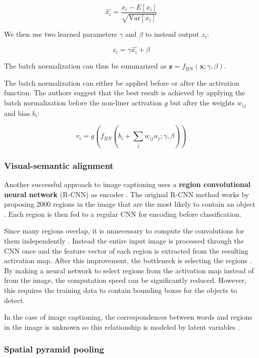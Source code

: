 \[
\hat{x_i} = \frac{x_i - E[x_i]}{ \sqrt{\text{Var} [x_i]} }
\]

We then use two learned parameters $\gamma$ and $\beta$ to instead output $z_i$:

\[
z_i = \gamma \hat{x_i} + \beta
\]

The batch normalization can thus be summarized as $\mathbf{z} = f_{BN}(\mathbf{x}; \gamma, \beta)$.

The batch normalization can either be applied before or after the activation function. The authors suggest that the best result is achieved by applying the batch normalization before the non-liner activation $g$ but after the weights $w_{ij}$ and bias $b_i$:

\[
v_i = g\left( f_{BN}\left( b_i + \sum_j w_{ij} u_j; \gamma, \beta \right) \right)
\]

\subsubsection{Visual-semantic alignment}


Another successful approach to image captioning uses a \textbf{region convolutional neural network} (R-CNN) as encoder \cite{VisualSemanticAlignment}.
The original R-CNN method works by proposing 2000 regions in the image that are the most likely to contain an object \cite{RCNN}. Each region is then fed to a regular CNN for encoding before classification.

Since many regions overlap, it is unnecessary to compute the convolutions for them independently \cite{FastRCNN}. Instead the entire input image is processed through the CNN once and the feature vector of each region is extracted from the resulting activation map. After this improvement, the bottleneck is selecting the regions \cite{FasterRCNN}. By making a neural network to select regions from the activation map instead of from the image, the computation speed can be significantly reduced. However, this requires the training data to contain bounding boxes for the objects to detect.

In the case of image captioning, the correspondences between words and regions in the image is unknown so this relationship is modeled by latent variables \cite{VisualSemanticAlignment}.

\subsubsection{Spatial pyramid pooling}

